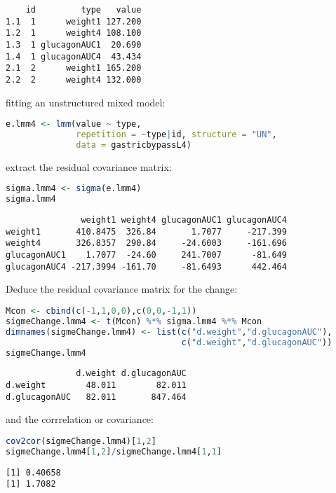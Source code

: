 \documentclass[12pt]{article}
\begin{document}
\label{}
\begin{verbatim}
    id         type   value
1.1  1      weight1 127.200
1.2  1      weight4 108.100
1.3  1 glucagonAUC1  20.690
1.4  1 glucagonAUC4  43.434
2.1  2      weight1 165.200
2.2  2      weight4 132.000
\end{verbatim}


fitting an unstructured mixed model:
\begin{lstlisting}[language=r,numbers=none]
e.lmm4 <- lmm(value ~ type,
              repetition = ~type|id, structure = "UN",
              data = gastricbypassL4)
\end{lstlisting}

extract the residual covariance matrix:
\begin{lstlisting}[language=r,numbers=none]
sigma.lmm4 <- sigma(e.lmm4)
sigma.lmm4
\end{lstlisting}

\label{}
\begin{verbatim}
               weight1 weight4 glucagonAUC1 glucagonAUC4
weight1       410.8475  326.84       1.7077     -217.399
weight4       326.8357  290.84     -24.6003     -161.696
glucagonAUC1    1.7077  -24.60     241.7007      -81.649
glucagonAUC4 -217.3994 -161.70     -81.6493      442.464
\end{verbatim}


Deduce the residual covariance matrix for the change:
\begin{lstlisting}[language=r,numbers=none]
Mcon <- cbind(c(-1,1,0,0),c(0,0,-1,1))
sigmeChange.lmm4 <- t(Mcon) %*% sigma.lmm4 %*% Mcon
dimnames(sigmeChange.lmm4) <- list(c("d.weight","d.glucagonAUC"),
                                   c("d.weight","d.glucagonAUC"))
sigmeChange.lmm4
\end{lstlisting}

\label{}
\begin{verbatim}
              d.weight d.glucagonAUC
d.weight        48.011        82.011
d.glucagonAUC   82.011       847.464
\end{verbatim}


and the corrrelation or covariance:
\begin{lstlisting}[language=r,numbers=none]
cov2cor(sigmeChange.lmm4)[1,2]
sigmeChange.lmm4[1,2]/sigmeChange.lmm4[1,1]
\end{lstlisting}

\label{}
\begin{verbatim}
[1] 0.40658
[1] 1.7082
\end{verbatim}
\end{document}
